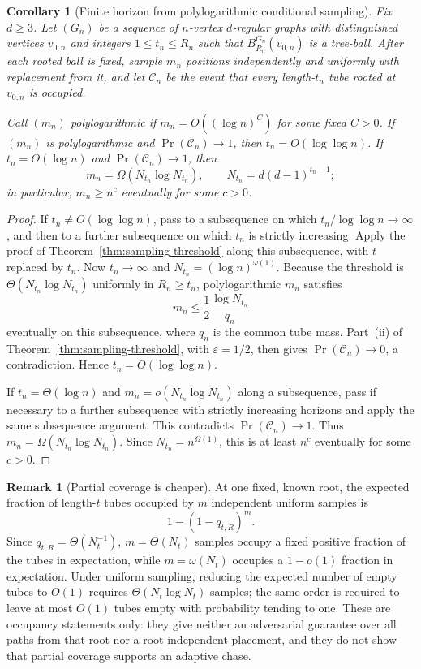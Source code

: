 \documentclass[11pt]{amsart}
\newtheorem{corollary}[theorem]{Corollary}
\theoremstyle{definition}
\newtheorem{remark}[theorem]{Remark}
\begin{document}
\begin{corollary}[Finite horizon from polylogarithmic conditional sampling]
\label{cor:polylog-horizon}
Fix $d\geq3$. Let $(G_n)$ be a sequence of $n$-vertex $d$-regular graphs with distinguished vertices $v_{0,n}$ and integers $1\leq t_n\leq R_n$ such that $B_{R_n}^{G_n}(v_{0,n})$ is a tree-ball. After each rooted ball is fixed, sample $m_n$ positions independently and uniformly with replacement from it, and let $\mathcal C_n$ be the event that every length-$t_n$ tube rooted at $v_{0,n}$ is occupied.

Call $(m_n)$ \emph{polylogarithmic} if $m_n=O((\log n)^C)$ for some fixed $C>0$. If $(m_n)$ is polylogarithmic and $\Pr(\mathcal C_n)\to1$, then $t_n=O(\log\log n)$. If $t_n=\Theta(\log n)$ and $\Pr(\mathcal C_n)\to1$, then
\[
m_n=\Omega(N_{t_n}\log N_{t_n}),
\qquad
N_{t_n}=d(d-1)^{t_n-1};
\]
in particular, $m_n\geq n^c$ eventually for some $c>0$.
\end{corollary}

\begin{proof}
If $t_n\neq O(\log\log n)$, pass to a subsequence on which $t_n/\log\log n\to\infty$, and then to a further subsequence on which $t_n$ is strictly increasing. Apply the proof of Theorem~\ref{thm:sampling-threshold} along this subsequence, with $t$ replaced by $t_n$. Now $t_n\to\infty$ and $N_{t_n}=(\log n)^{\omega(1)}$. Because the threshold is $\Theta(N_{t_n}\log N_{t_n})$ uniformly in $R_n\geq t_n$, polylogarithmic $m_n$ satisfies
\[
m_n\leq\frac12\frac{\log N_{t_n}}{q_n}
\]
eventually on this subsequence, where $q_n$ is the common tube mass. Part~(ii) of Theorem~\ref{thm:sampling-threshold}, with $\varepsilon=1/2$, then gives $\Pr(\mathcal C_n)\to0$, a contradiction. Hence $t_n=O(\log\log n)$.

If $t_n=\Theta(\log n)$ and $m_n=o(N_{t_n}\log N_{t_n})$ along a subsequence, pass if necessary to a further subsequence with strictly increasing horizons and apply the same subsequence argument. This contradicts $\Pr(\mathcal C_n)\to1$. Thus $m_n=\Omega(N_{t_n}\log N_{t_n})$. Since $N_{t_n}=n^{\Omega(1)}$, this is at least $n^c$ eventually for some $c>0$.
\end{proof}

\begin{remark}[Partial coverage is cheaper]
\label{rem:partial-coverage}
At one fixed, known root, the expected fraction of length-$t$ tubes occupied by $m$ independent uniform samples is
\[
1-(1-q_{t,R})^m.
\]
Since $q_{t,R}=\Theta(N_t^{-1})$, $m=\Theta(N_t)$ samples occupy a fixed positive fraction of the tubes in expectation, while $m=\omega(N_t)$ occupies a $1-o(1)$ fraction in expectation. Under uniform sampling, reducing the expected number of empty tubes to $O(1)$ requires $\Theta(N_t\log N_t)$ samples; the same order is required to leave at most $O(1)$ tubes empty with probability tending to one. These are occupancy statements only: they give neither an adversarial guarantee over all paths from that root nor a root-independent placement, and they do not show that partial coverage supports an adaptive chase.
\end{remark}
\end{document}
